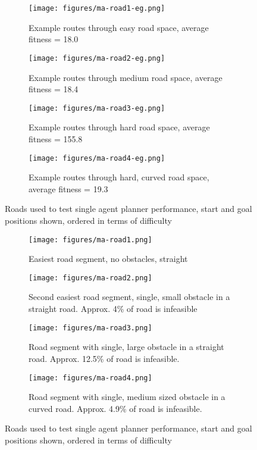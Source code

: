 \begin{figure}
  \centering
  \begin{subfigure}[b]{0.44\textwidth}
    \centering
    \texttt{[image: figures/ma-road1-eg.png]}
    \caption{\label{subfig:ma-road1-eg}Example routes through easy road space, average fitness = 18.0 }
  \end{subfigure}
  \begin{subfigure}[b]{0.44\textwidth}
    \centering
    \texttt{[image: figures/ma-road2-eg.png]}
    \caption{\label{subfig:ma-road2-eg}Example routes through medium road space, average fitness = 18.4 }
  \end{subfigure}
  \begin{subfigure}[b]{0.44\textwidth}
    \centering
    \texttt{[image: figures/ma-road3-eg.png]}
    \caption{\label{subfig:ma-road3-eg}Example routes through hard road space, average fitness = 155.8}
  \end{subfigure}
  \begin{subfigure}[b]{0.44\textwidth}
    \centering
    \texttt{[image: figures/ma-road4-eg.png]}
    \caption{\label{subfig:ma-road4-eg}Example routes through hard, curved road space, average fitness = 19.3 }
  \end{subfigure}
  \caption{\label{fig:multi-agent-roads-egs} Roads used to test single agent planner performance, start and goal positions shown, ordered in terms of difficulty}
\end{figure}


\begin{figure}
  \centering
  \begin{subfigure}[b]{0.44\textwidth}
    \centering
    \texttt{[image: figures/ma-road1.png]}
    \caption{\label{subfig:ma-road1}Easiest road segment, no obstacles, straight}
  \end{subfigure}
  \begin{subfigure}[b]{0.44\textwidth}
    \centering
    \texttt{[image: figures/ma-road2.png]}
    \caption{\label{subfig:ma-road2}Second easiest road segment, single, small obstacle in a straight road. Approx. 4\% of road is infeasible}
  \end{subfigure}
  \begin{subfigure}[b]{0.44\textwidth}
    \centering
    \texttt{[image: figures/ma-road3.png]}
    \caption{\label{subfig:ma-road3}Road segment with single, large obstacle in a straight road. Approx. 12.5\% of road is infeasible.}
  \end{subfigure}
  \begin{subfigure}[b]{0.44\textwidth}
    \centering
    \texttt{[image: figures/ma-road4.png]}
    \caption{\label{subfig:ma-road4}Road segment with single, medium sized obstacle in a curved road. Approx. 4.9\% of road is infeasible.}
  \end{subfigure}
  \caption{\label{fig:multi-agent-roads} Roads used to test single agent planner performance, start and goal positions shown, ordered in terms of difficulty}
\end{figure}

